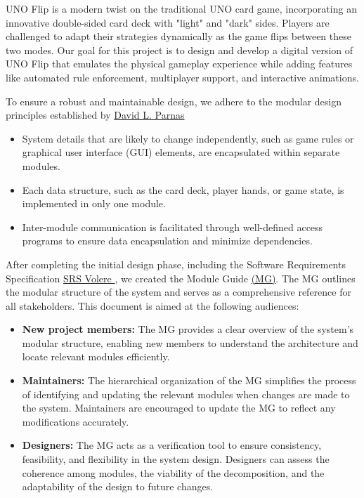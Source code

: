 \documentclass[12pt, titlepage]{article}
\begin{document}
UNO Flip is a modern twist on the traditional UNO card game, incorporating an innovative double-sided card deck with "light" and "dark" sides. Players are challenged to adapt their strategies dynamically as the game flips between these two modes. Our goal for this project is to design and develop a digital version of UNO Flip that emulates the physical gameplay experience while adding features like automated rule enforcement, multiplayer support, and interactive animations.

To ensure a robust and maintainable design, we adhere to the modular design principles established by \href{https://cabibbo.dia.uniroma3.it/asw/altrui/parnas-1972.pdf}{David L. Parnas}


\begin{itemize}
\item System details that are likely to change independently, such as game rules or graphical user interface (GUI) elements, are encapsulated within separate modules.
\item Each data structure, such as the card deck, player hands, or game state, is implemented in only one module.
\item Inter-module communication is facilitated through well-defined access programs to ensure data encapsulation and minimize dependencies.
\end{itemize}

After completing the initial design phase, including the Software Requirements Specification 
\href{https://github.com/simon-0215/UNO-Flip-3D/tree/main/docs/SRS-Volere}{SRS Volere }, we created the Module Guide \href{https://github.com/simon-0215/UNO-Flip-3D/blob/main/docs/Design/SoftArchitecture/MG.pdf}{ (MG)}. The MG outlines the modular structure of the system and serves as a comprehensive reference for all stakeholders. This document is aimed at the following audiences:

\begin{itemize}
\item \textbf{New project members:} The MG provides a clear overview of the system's modular structure, enabling new members to understand the architecture and locate relevant modules efficiently.
\item \textbf{Maintainers:} The hierarchical organization of the MG simplifies the process of identifying and updating the relevant modules when changes are made to the system. Maintainers are encouraged to update the MG to reflect any modifications accurately.
\item \textbf{Designers:} The MG acts as a verification tool to ensure consistency, feasibility, and flexibility in the system design. Designers can assess the coherence among modules, the viability of the decomposition, and the adaptability of the design to future changes.
\end{itemize}
\end{document}
